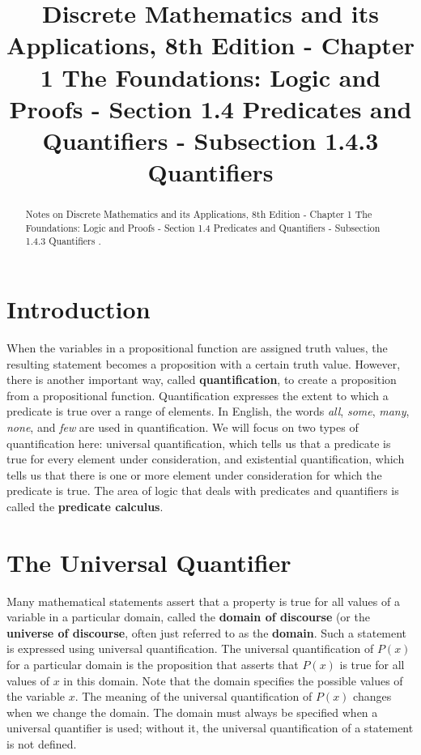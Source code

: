 \documentclass{Axon}
\title{Discrete Mathematics and its Applications, 8th Edition - Chapter 1 The Foundations: Logic and Proofs - Section 1.4 Predicates and Quantifiers - Subsection 1.4.3 Quantifiers}
\begin{document}
\maketitle
\makeauthor
\begin{abstract}
Notes on Discrete Mathematics and its Applications, 8th Edition - Chapter 1 The Foundations: Logic and Proofs - Section 1.4 Predicates and Quantifiers - Subsection 1.4.3 Quantifiers \cite{Rosen}.
\end{abstract}
\section{Introduction}
When the variables in a propositional function are assigned truth values, the resulting statement becomes a proposition with a certain truth value. However, there is another important way, called \textbf{quantification}, to create a proposition from a propositional function. Quantification expresses the extent to which a predicate is true over a range of elements. In English, the words \textit{all}, \textit{some}, \textit{many}, \textit{none}, and \textit{few} are used in quantification. We will focus on two types of quantification here: universal quantification, which tells us that a predicate is true for every element under consideration, and existential quantification, which tells us that there is one or more element under consideration for which the predicate is true. The area of logic that deals with predicates and quantifiers is called the \textbf{predicate calculus}.

\section{The Universal Quantifier}
Many mathematical statements assert that a property is true for all values of a variable in a particular domain, called the \textbf{domain of discourse} (or the \textbf{universe of discourse}, often just referred to as the \textbf{domain}. Such a statement is expressed using universal quantification. The universal quantification of \(P(x)\) for a particular domain is the proposition that asserts that \(P(x)\) is true for all values of \(x\) in this domain. Note that the domain specifies the possible values of the variable \(x\). The meaning of the universal quantification of \(P(x)\) changes when we change the domain. The domain must always be specified when a universal quantifier is used; without it, the universal quantification of a statement is not defined.
\end{document}
